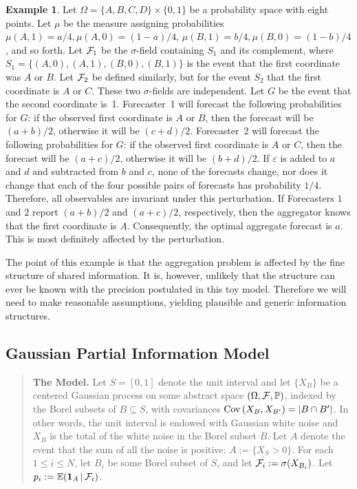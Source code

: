 \documentclass[11pt]{article}
\renewcommand{\P}{\mathbb{P}}
\newcommand{\E}{\mathbb{E}}
\theoremstyle{definition}
\newtheorem{example}[theorem]{Example}
\theoremstyle{definition}
\def\one{{\bf 1}}
\def\F{{\cal F}}
\def\P{{\mathbb P}}
\def\E{{\mathbb E}}
\def\Cov{{\rm Cov}\,}
\def\ee{\varepsilon}
\def\|{\, | \,}
\begin{document}
\begin{example}
Let 
$\Omega = \{ A,B,C,D \} \times \{ 0,1 \}$ be a probability space 
with eight points.  Let $\mu$ be the measure assigning 
probabilities $\mu (A,1) = a/4, \mu (A,0) = (1-a)/4$, 
$\mu (B,1) = b/4, \mu (B,0) = (1-b)/4$, and so forth.
Let $\F_1$ be the $\sigma$-field containing $S_1$ and its complement, 
where $S_1 = \{ (A,0),(A,1),(B,0),(B,1) \}$ is the
event that the first coordinate was $A$ or $B$.  Let $\F_2$
be defined similarly, but for the event $S_2$ that the first coordinate
is $A$ or $C$.  These two $\sigma$-fields are independent.
Let $G$ be the event that the second coordinate is~1.
Forecaster~1 will forecast the following probabilities for $G$:
if the observed first coordinate is $A$ or $B$, then
the forecast will be $(a+b)/2$, otherwise it will be $(c+d)/2$.
Forecaster~2 will forecast the following probabilities for $G$:
if the observed first coordinate is $A$ or $C$, then
the forecast will be $(a+c)/2$, otherwise it will be $(b+d)/2$.
If $\ee$ is added to $a$ and $d$ and subtracted from $b$ and $c$,
none of the forecasts change, nor does it change that each of
the four possible pairs of forecasts has probability $1/4$.
Therefore, all observables are invariant under this perturbation.
If Forecasters $1$ and $2$ report $(a+b)/2$ and $(a+c)/2$, respectively, then the aggregator knows that
the first coordinate is $A$.  Consequently, the optimal aggregate forecast is $a$.  This is most definitely affected by the perturbation.  
\end{example}

The point of this example is that the aggregation problem is 
affected by the fine structure of shared information.  It is, however,
unlikely that the structure can ever be known with the precision
postulated in this toy model.  Therefore we will need to make
reasonable assumptions, yielding plausible and generic information
structures.

\subsection{Gaussian Partial Information Model}
\label{ss:Gaussian}

\begin{quote}
{\bf The Model.} Let $S = [0,1]$ denote 
the unit interval and let $\{ X_B \}$ be a centered Gaussian process 
on some abstract space $(\Omega , \F , \P)$, indexed by the 
Borel subsets of $B \subseteq S$, with covariances $\Cov (X_B , X_{B'}) 
= |B \cap B'|$.  In other words, the unit interval is endowed
with Gaussian white noise and $X_B$ is the total of the white
noise in the Borel subset $B$.  Let $A$ denote the event that
the sum of all the noise is positive: $A := \{ X_S > 0 \}$.
For each $1 \leq i \leq N$, let $B_i$ be some Borel subset of $S$,
and let $\F_i := \sigma (X_{B_i})$.  Let $p_i := \E (\one_A \| \F_i)$.
\end{quote}
\end{document}

